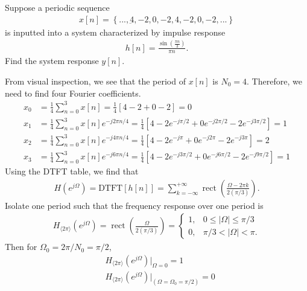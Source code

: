 \documentclass{report}
\begin{document}
\begin{example}
    Suppose a periodic sequence
    \begin{align*}
        x[n] = \left\{...,\underbar{4},-2,0,-2,4,-2,0,-2,...\right\}
    \end{align*}
    is inputted into a system characterized by impulse response
    \begin{align*}
        h[n] = \frac{\sin\left(\frac{\pi n}{3}\right)}{\pi n}.
    \end{align*}
    Find the system response $y[n]$.
\end{example}
\begin{solution}
    From visual inspection, we see that the period of $x[n]$ is $N_0=4$. Therefore, we need to find four Fourier coefficients. 
    \begin{align*}
        x_0 &= \frac{1}{4} \sum_{n=0}^{3} x[n] = \frac{1}{4}[4-2+0-2] = 0 \\
        x_1 &= \frac{1}{4} \sum_{n=0}^{3} x[n]e^{-j2\pi n/4} = \frac{1}{4}[4-2e^{-j\pi/2}+0e^{-j2\pi/2}-2e^{-j3\pi/2}] = 1 \\
        x_2 &= \frac{1}{4} \sum_{n=0}^{3} x[n]e^{-j4\pi n/4} = \frac{1}{4}[4-2e^{-j\pi}+0e^{-j2\pi}-2e^{-j3\pi}] = 2 \\
        x_3 &= \frac{1}{4} \sum_{n=0}^{3} x[n]e^{-j6\pi n/4} = \frac{1}{4}[4-2e^{-j3\pi/2}+0e^{-j6\pi/2}-2e^{-j9\pi/2}] = 1
    \end{align*}
    Using the DTFT table, we find that 
    \begin{align*}
        H(e^{j\Omega}) = \text{DTFT}[h[n]] = \sum_{k=-\infty}^{+\infty} \operatorname{rect}\left(\frac{\Omega-2\pi k}{2(\pi/3)}\right).
    \end{align*}
    Isolate one period such that the frequency response over one period is
    \begin{align*}
        H_{\langle 2\pi\rangle}(e^{j\Omega}) = \operatorname{rect}\left(\frac{\Omega}{2(\pi/3)}\right) = 
        \begin{cases}
            1, & 0\leq|\Omega|\leq\pi/3 \\
            0, & \pi/3<|\Omega|<\pi.
        \end{cases}
    \end{align*}
    Then for $\Omega_0=2\pi/N_0=\pi/2$, 
    \begin{align*}
        &H_{\langle 2\pi\rangle}(e^{j\Omega})\bigg|_{\Omega=0} = 1 \\
        &H_{\langle 2\pi\rangle}(e^{j\Omega})\bigg|_{(\Omega=\Omega_0=\pi/2)} = 0 \\

\end{align*}
\end{solution}
\end{document}
